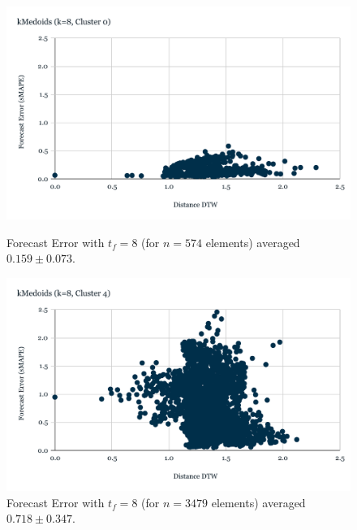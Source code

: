 \begin{figure}[!htbp]
  \centering
  \begin{minipage}[b]{0.45\textwidth}
    \includegraphics[width=\textwidth]{../Figures/distDTW_ForecastError_k8_c0}
    \caption{Forecast Error with $t_{f}=8$ (for $n=574$ elements) averaged $0.159 \pm 0.073$.}
    \label{Fig:DTWsMAPE_k8_c0}
  \end{minipage}
  \hfill
  \begin{minipage}[b]{0.45\textwidth}
    \includegraphics[width=\textwidth]{../Figures/distDTW_ForecastError_k8_c4}
    \caption{Forecast Error with $t_{f}=8$ (for $n=3479$ elements) averaged $0.718 \pm 0.347$.}
    \label{Fig:DTWsMAPE_k8_c4}
  \end{minipage}


\end{figure}
